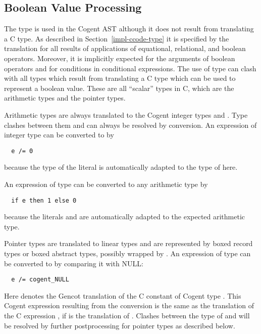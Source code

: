 \subsection{Boolean Value Processing}
\label{impl-post-bool}

The type  is used in the Cogent AST although it does not result from translating a C type. As described in
Section~\ref{impl-ccode-type} it is specified by the translation for all results of applications of equational, relational,
and boolean operators. Moreover, it is implicitly expected for the arguments of boolean operators and for conditions in conditional
expressions. The use of type  can clash with all types which result from translating a C type which can be used to
represent a boolean value. These are all ``scalar'' types in C, which are the arithmetic types and the pointer types.

Arithmetic types are always translated to the Cogent integer types  and . Type clashes between
them and  can always be resolved by conversion. An expression  of integer type can be converted
to  by
\begin{verbatim}
  e /= 0
\end{verbatim}
because the type of the literal  is automatically adapted to the type of  here.

An expression  of type  can be converted to any arithmetic type by
\begin{verbatim}
  if e then 1 else 0
\end{verbatim}
because the literals  and  are automatically adapted to the expected arithmetic type.

Pointer types are translated to linear types and are represented by boxed record types or boxed abstract types, possibly wrapped
by . An expression  of type  can be converted to  by comparing it with NULL:
\begin{verbatim}
  e /= cogent_NULL
\end{verbatim}
Here  denotes the Gencot translation of the C constant  of Cogent type . This
Cogent expression resulting from the conversion is the same as the translation of the C expression , if
 is the translation of . Clashes between the type of  and  will be resolved
by further postprocessing for pointer types as described below.

